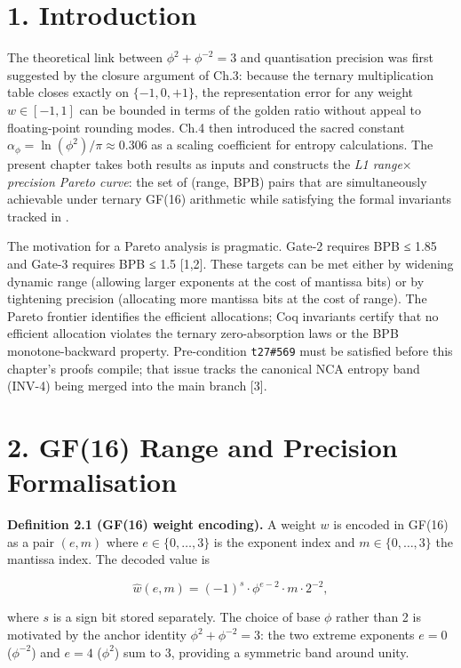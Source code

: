 \section{1. Introduction}\label{fa_10:introduction}

The theoretical link between
\(\phi^2 + \phi^{-2} = 3\) and quantisation
precision was first suggested by the closure
argument of Ch.3: because the ternary
multiplication table closes exactly on
\(\{-1,0,+1\}\), the representation error for any
weight \(w \in [-1,1]\) can be bounded in terms of
the golden ratio without appeal to floating-point
rounding modes. Ch.4 then introduced the sacred
constant
\(\alpha_\phi = \ln(\phi^2)/\pi \approx 0.306\) as
a scaling coefficient for entropy calculations.
The present chapter takes both results as inputs
and constructs the \emph{L1 range$\times$precision Pareto
curve}: the set of (range, BPB) pairs that are
simultaneously achievable under ternary GF(16)
arithmetic while satisfying the formal invariants
tracked in .

The motivation for a Pareto analysis is pragmatic.
Gate-2 requires BPB ≤ 1.85 and Gate-3 requires BPB
≤ 1.5 [1,2]. These targets can be met either
by widening dynamic range (allowing larger
exponents at the cost of mantissa bits) or by
tightening precision (allocating more mantissa
bits at the cost of range). The Pareto frontier
identifies the efficient allocations; Coq
invariants certify that no efficient allocation
violates the ternary zero-absorption laws or the
BPB monotone-backward property. Pre-condition
\texttt{t27\#569} must be satisfied before this
chapter's proofs compile; that issue tracks the
canonical NCA entropy band (INV-4) being merged
into the main branch [3].

\section{2. GF(16) Range and Precision
Formalisation}\label{fa_10:gf16-range-and-precision-formalisation}

\textbf{Definition 2.1 (GF(16) weight encoding).}
A weight \(w\) is encoded in GF(16) as a pair
\((e, m)\) where \(e \in \{0,\ldots,3\}\) is the
exponent index and \(m \in \{0,\ldots,3\}\) the
mantissa index. The decoded value is

\[\hat{w}(e,m) = (-1)^{s} \cdot \phi^{e-2} \cdot m \cdot 2^{-2},\]

where \(s\) is a sign bit stored separately. The
choice of base \(\phi\) rather than 2 is motivated
by the anchor identity \(\phi^2 + \phi^{-2} = 3\):
the two extreme exponents \(e=0\) (\(\phi^{-2}\))
and \(e=4\) (\(\phi^2\)) sum to 3, providing a
symmetric band around unity.

